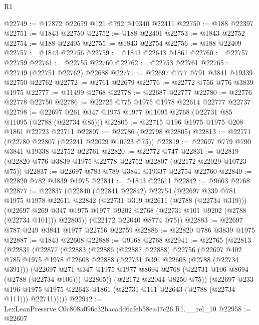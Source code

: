 \begin{lexlean}{R1}
\begin{coremodule}
@22749 := @17872 @22679 @121 @792 @19340 @22411
@22750 := @188 @22397
@22751 := @1843 @22750
@22752 := @188 @22401
@22753 := @1843 @22752
@22754 := @188 @22405
@22755 := @1843 @22754
@22756 := @188 @22409
@22757 := @1843 @22756
@22759 := @1843 @22643 @1861
@22760 := @22757 @22759
@22761 := @22755 @22760
@22762 := @22753 @22761
@22765 := @22749 (@22751 @22762) @22688
@22771 := @22697 @777 @791 @3841 @19339 @22750 @22762
@22772 := @2761 @22679
@22776 := @22772 @756 @776 @3839 @1975
@22777 := @11499 @2768
@22778 := @22687 @22777
@22780 := @22776 @22778 @22750
@22786 := @22725 @775 @1975 @1978 @22614 @22777 @22737
@22798 := @22697 @261 @347 @1975 @1977 @11095 @2768 (@22731 @85 @11095 (@2788 (@22734 @85)))
@22805 := @22715 @196 @1975 @1975 @208 @1861 @22723 @22711
@22807 := @22786 (@22798 @22805)
@22813 := @22771 (@22780 @22807 (@22241 @22029 @10723 @75))
@22819 := @22697 @779 @790 @3841 @19338 @22752 @22761
@22820 := @22772 @747
@22831 := @22819 (@22820 @776 @3839 @1975 @22778 @22752 @22807 (@22172 @22029 @10723 @75))
@22837 := @22697 @783 @789 @3841 @19337 @22754 @22760
@22840 := @22820 @782 @3839 @1975
@22841 := @1843 @22611
@22842 := @9663 @2768
@22877 := @22837
    (@22840
      (@22841 @22842)
      @22754
      (@22697
        @339
        @781
        @1975
        @1978
        @22611
        @22842
        (@22731 @319 @22611 (@2788 (@22734 @319)))
        (@22697 @269 @347 @1975 @1977 @9202 @2768 (@22731 @101 @9202 (@2788 (@22734 @101))) @22805))
      (@22172 @22040 @8774 @75))
@22883 := @22697 @787 @249 @3841 @1977 @22756 @22759
@22886 := @22820 @786 @3839 @1975
@22887 := @1843 @22608
@22888 := @9168 @2768
@22941 := @22765
    (@22813
      (@22831
        (@22877
          (@22883
            (@22886
              (@22887 @22888)
              @22756
              (@22697
                @402
                @785
                @1975
                @1978
                @22608
                @22888
                (@22731 @391 @22608 (@2788 (@22734 @391)))
                (@22697
                  @271
                  @347
                  @1975
                  @1977
                  @8694
                  @2768
                  (@22731 @106 @8694 (@2788 (@22734 @106)))
                  @22805))
              (@22172 @22044 @8250 @75))
            (@22697
              @233
              @196
              @1975
              @1975
              @22643
              @1861
              (@22731 @111 @22643 (@2788 (@22734 @111)))
              @22711)))))
@22942 := LexLeanPreserve.C0c808a096c32bacadd6afeb58ea47c26.R1.__rel_10
@22958 := @22607

\end{coremodule}
\end{lexlean}
